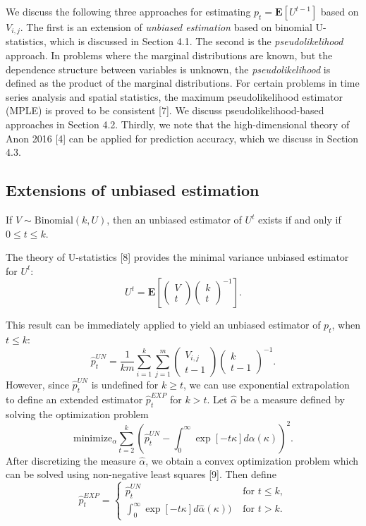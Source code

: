 \documentclass{article}
\newcommand{\E}{\textbf{E}}
\begin{document}
We discuss the following three approaches for estimating $p_t =
\E[U^{t-1}]$ based on $V_{i, j}$.  The first is an extension of \emph{unbiased
  estimation} based on binomial U-statistics, which is discussed in
Section 4.1.  The second is the \emph{pseudolikelihood} approach.  In
problems where the marginal distributions are known, but the
dependence structure between variables is unknown, the
\emph{pseudolikelihood} is defined as the product of the marginal
distributions.  For certain problems in time series analysis and
spatial statistics, the maximum pseudolikelihood estimator (MPLE) is
proved to be consistent [7].  We discuss pseudolikelihood-based
approaches in Section 4.2.  Thirdly, we note that the high-dimensional
theory of Anon 2016 [4] can be applied for prediction accuracy, which we discuss in Section 4.3.

\subsection{Extensions of unbiased estimation}

If $V \sim \text{Binomial}(k, U)$, then an unbiased estimator of $U^t$ exists
if and only if $0 \leq t \leq k$.

The theory of U-statistics [8] provides the minimal variance unbiased estimator for $U^t$:
\[
U^t = \E\left[\begin{pmatrix}
V \\ t
\end{pmatrix}
\begin{pmatrix}
k \\ t
\end{pmatrix}^{-1}\right].
\]

This result can be immediately applied to yield an unbiased estimator of $p_t$, when $t \leq k$:
\begin{equation}\label{eq:ustat}
\hat{p}_t^{UN} =  \frac{1}{km}\sum_{i=1}^k\sum_{j=1}^{m} \begin{pmatrix}
V_{i, j} \\ t-1
\end{pmatrix}
\begin{pmatrix}
k \\ t-1
\end{pmatrix}^{-1}.
\end{equation}
However, since $\hat{p}_t^{UN}$ is undefined for $k \geq t$, we can use exponential extrapolation
to define an extended estimator $\hat{p}_t^{EXP}$ for $k > t$.
Let $\hat{\alpha}$ be a measure defined by solving the optimization problem
\[
\text{minimize}_{\alpha} \sum_{t=2}^{k} \left(\hat{p}_t^{UN} - \int_0^\infty \exp[-t\kappa] d\alpha(\kappa)\right)^2.
\]
After discretizing the measure $\hat{\alpha}$, we obtain a convex optimization problem
which can be solved using non-negative least squares [9].
Then define
\[
\hat{p}_t^{EXP} = \begin{cases}
\hat{p}_t^{UN}&\text{ for }t \leq k,\\
\int_0^\infty \exp[-t\kappa] d\hat{\alpha}(\kappa))&\text{ for }t > k.
\end{cases}
\]
\end{document}
